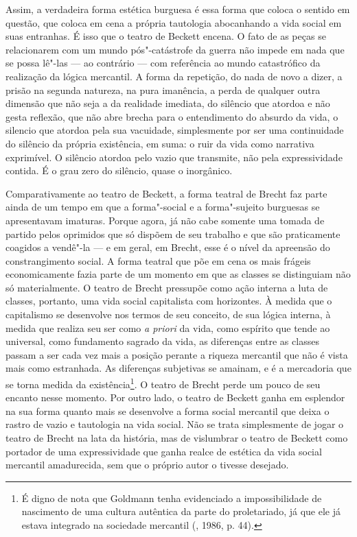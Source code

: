Assim, a verdadeira forma estética burguesa é essa forma que coloca o
sentido em questão, que coloca em cena a própria tautologia abocanhando
a vida social em suas entranhas. É isso que o teatro de Beckett encena.
O fato de as peças se relacionarem com um mundo pós"-catástrofe da guerra
não impede em nada que se possa lê"-las --- ao contrário --- com
referência ao mundo catastrófico da realização da lógica mercantil. A
forma da repetição, do nada de novo a dizer, a prisão na segunda
natureza, na pura imanência, a perda de qualquer outra dimensão que não
seja a da realidade imediata, do silêncio que atordoa e não gesta
reflexão, que não abre brecha para o entendimento do absurdo da vida, o
silencio que atordoa pela sua vacuidade, simplesmente por ser uma
continuidade do silêncio da própria existência, em suma: o ruir da vida
como narrativa exprimível. O silêncio atordoa pelo vazio que transmite,
não pela expressividade contida. É o grau zero do silêncio, quase o
inorgânico.

Comparativamente ao teatro de Beckett, a forma teatral de Brecht faz
parte ainda de um tempo em que a forma"-social e a forma"-sujeito
burguesas se apresentavam imaturas. Porque agora, já não cabe somente
uma tomada de partido pelos oprimidos que só dispõem de seu trabalho e
que são praticamente coagidos a vendê"-la --- e em geral, em Brecht, esse
é o nível da apreensão do constrangimento social. A forma teatral que
põe em cena os mais frágeis economicamente fazia parte de um momento em
que as classes se distinguiam não só materialmente. O teatro de Brecht
pressupõe como ação interna a luta de classes, portanto, uma vida social
capitalista com horizontes. À medida que o capitalismo se desenvolve nos
termos de seu conceito, de sua lógica interna, à medida que realiza seu
ser como \emph{a priori} da vida, como espírito que tende ao universal,
como fundamento sagrado da vida, as diferenças entre as classes passam a
ser cada vez mais a posição perante a riqueza mercantil que não é vista
mais como estranhada. As diferenças subjetivas se amainam, e é a
mercadoria que se torna medida da existência\footnote{É digno de nota
  que Goldmann tenha evidenciado a impossibilidade de nascimento de uma
  cultura autêntica da parte do proletariado, já que ele já estava
  integrado na sociedade mercantil (, 1986, p. 44).}. O teatro
de Brecht perde um pouco de seu encanto nesse momento. Por outro lado, o
teatro de Beckett ganha em esplendor na sua forma quanto mais se
desenvolve a forma social mercantil que deixa o rastro de vazio e
tautologia na vida social. Não se trata simplesmente de jogar o teatro
de Brecht na lata da história, mas de vislumbrar o teatro de Beckett
como portador de uma expressividade que ganha realce de estética da vida
social mercantil amadurecida, sem que o próprio autor o tivesse
desejado.

